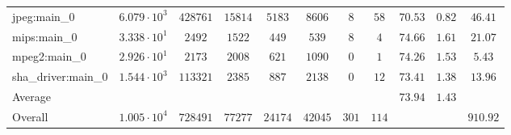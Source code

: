 \begin{tabular}{|l|c|c|c|c|c|c|c|c|c|c|}
jpeg:main\_0            & $ 6.079 \cdot 10^{3} $ & $ 428761 $ & $ 15814 $ & $ 5183  $ & $ 8606  $ & $ 8   $ & $ 58  $ & $ 70.53       $ & $ 0.82    $ & $ 46.41   $ \\
mips:main\_0            & $ 3.338 \cdot 10^{1} $ & $ 2492   $ & $ 1522  $ & $ 449   $ & $ 539   $ & $ 8   $ & $ 4   $ & $ 74.66       $ & $ 1.61    $ & $ 21.07   $ \\
mpeg2:main\_0           & $ 2.926 \cdot 10^{1} $ & $ 2173   $ & $ 2008  $ & $ 621   $ & $ 1090  $ & $ 0   $ & $ 1   $ & $ 74.26       $ & $ 1.53    $ & $ 5.43    $ \\
sha\_driver:main\_0     & $ 1.544 \cdot 10^{3} $ & $ 113321 $ & $ 2385  $ & $ 887   $ & $ 2138  $ & $ 0   $ & $ 12  $ & $ 73.41       $ & $ 1.38    $ & $ 13.96   $ \\
\hline
Average                 & $                    $ & $        $ & $       $ & $       $ & $       $ & $     $ & $     $ & $ 73.94       $ & $ 1.43    $ & $         $ \\
\hline
Overall                 & $ 1.005 \cdot 10^{4} $ & $ 728491 $ & $ 77277 $ & $ 24174 $ & $ 42045 $ & $ 301 $ & $ 114 $ & $             $ & $         $ & $ 910.92  $ \\
\hline
\end{tabular}
